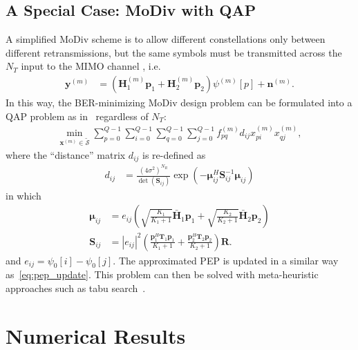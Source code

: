 \documentclass[journal,draftcls,onecolumn,12pt,twoside]{IEEEtran}
\begin{document}
\subsection{A Special Case: MoDiv with QAP}
A simplified MoDiv scheme is to allow different constellations only between
different retransmissions, but the same symbols must be transmitted across the
$N_T$ input to the MIMO channel , i.e.
\begin{align}
  \mathbf{y}^{(m)} & = \left(\mathbf{H}_1^{(m)}\mathbf{p}_1  +
  \mathbf{H}_2^{(m)}\mathbf{p}_2\right) \psi^{(m)}[p] + \mathbf{n}^{(m)}.
\end{align}
In this way, the BER-minimizing
MoDiv design problem can be formulated into a QAP problem as
in~\cite{wu2016modulation} regardless of $N_T$:
\begin{align}
  \min_{\mathbf{x}^{(m)}\in \tilde{\mathcal{S}}}
  \sum_{p=0}^{Q-1}\sum_{i=0}^{Q-1}\sum_{q=0}^{Q-1}
  \sum_{j=0}^{Q-1}
  f_{pq}^{(m)}d_{ij}x_{pi}^{(m)}x_{qj}^{(m)},
  \label{eq:SQAP}
\end{align}
where the ``distance'' matrix $d_{ij}$ is re-defined as
\begin{align}
  d_{ij} & = \frac{(4\sigma^2)^{N_R}}{\det(\mathbf{S}_{ij})}
      \exp\left(-\bm{\mu}_{ij}^H\mathbf{S}_{ij}^{-1}\bm{\mu}_{ij}\right)
\end{align}
in which 
\begin{subequations}
  \begin{align}
    \bm{\mu}_{ij} & = e_{ij} \left( \sqrt{\frac{K_1}{K_1+1}}
    \bar{\mathbf{H}}_1\mathbf{p}_1 +
    \sqrt{\frac{K_2}{K_2+1}}\bar{\mathbf{H}}_2\mathbf{p}_2\right)  \\
    \mathbf{S}_{ij} & = |e_{ij}|^2\left(\frac{
    \mathbf{p}_1^H\mathbf{T}_1 \mathbf{p}_1}{K_1+1} + \frac{
    \mathbf{p}_2^H\mathbf{T}_2 \mathbf{p}_2}{K_2+1}\right) \mathbf{R}.
  \end{align}
\end{subequations}
and $e_{ij} = \psi_0[i] - \psi_0[j]$. The approximated PEP is updated
in a similar way as~\eqref{eq:pep_update}. This problem can then be solved with
meta-heuristic approaches such as tabu search~\cite{taillard1991robust}.

\section{Numerical Results}
\label{sec:numerical}
\end{document}
